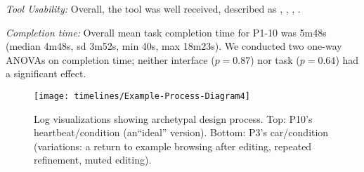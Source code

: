 %


\emph{Tool Usability:} Overall, the tool was well received, described as , , %
, .


\emph{Completion time:}
Overall mean task completion time for P1-10 was 5m48s (median 4m48s, sd 3m52s, min 40s, max 18m23s).
We conducted two one-way ANOVAs on  completion time;
neither interface ($p=0.87$) nor task ($p=0.64$) had a significant effect. %


\begin{figure}[tb]
    \centering  
    \texttt{[image: timelines/Example-Process-Diagram4]}
    \caption{Log visualizations showing archetypal design process. Top: P10's heartbeat/\vis condition (an``ideal'' version). Bottom: P3's car/\hi condition (variations: a return to example browsing after editing, repeated refinement, muted editing).
    } 
    \label{fig:archetype}
\end{figure}


